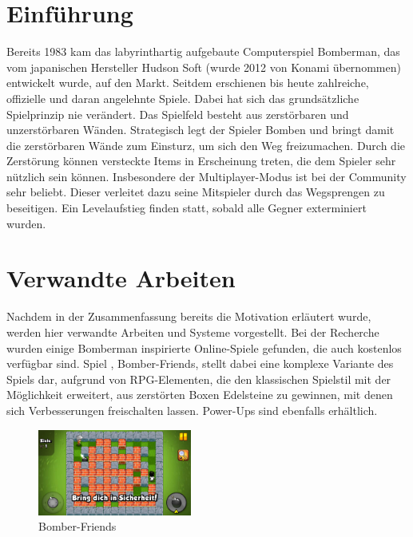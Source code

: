 \documentclass[conference]{IEEEtran}
\begin{document}
\section{Einführung}
Bereits 1983 kam das labyrinthartig aufgebaute Computerspiel \glqq Bomberman\grqq{}, das vom japanischen Hersteller Hudson Soft (wurde 2012 von Konami übernommen) entwickelt wurde, auf den Markt. Seitdem erschienen bis heute zahlreiche, offizielle und daran angelehnte Spiele. Dabei hat sich das grundsätzliche Spielprinzip nie verändert. Das Spielfeld besteht aus zerstörbaren und unzerstörbaren Wänden. Strategisch legt der Spieler Bomben und bringt damit die zerstörbaren Wände zum Einsturz, um sich den Weg freizumachen. Durch die Zerstörung können versteckte Items in Erscheinung treten, die dem Spieler sehr nützlich sein können. Insbesondere der Multiplayer-Modus ist bei der Community sehr beliebt. Dieser verleitet dazu seine Mitspieler durch das Wegsprengen zu beseitigen. Ein Levelaufstieg finden statt, sobald alle Gegner exterminiert wurden.  



\section{Verwandte Arbeiten}
Nachdem in der Zusammenfassung bereits die Motivation erläutert wurde, werden hier verwandte Arbeiten und Systeme vorgestellt. Bei der Recherche wurden einige Bomberman inspirierte Online-Spiele gefunden, die auch kostenlos verfügbar sind. Spiel \cite{bombe-friends}, Bomber-Friends, stellt dabei eine komplexe Variante des Spiels dar, aufgrund von RPG-Elementen, die den klassischen Spielstil mit der Möglichkeit erweitert, aus zerstörten Boxen Edelsteine zu gewinnen, mit denen sich Verbesserungen freischalten lassen. Power-Ups sind ebenfalls erhältlich. 
\begin{figure}[H]
    \centering
    \includegraphics[width=0.45\textwidth]{res/bomberfriends.png}
    \caption{Bomber-Friends}
\end{figure}
\end{document}
